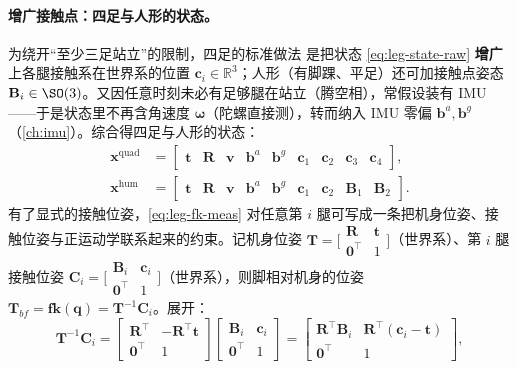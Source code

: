 \paragraph{增广接触点：四足与人形的状态。}
为绕开“至少三足站立”的限制，四足的标准做法\cite{bloesch2013state} 是把状态 \cref{eq:leg-state-raw} \textbf{增广}上各腿接触系在世界系的位置 $\mathbf{c}_i\in\mathbb{R}^3$；人形（有脚踝、平足）还可加接触点姿态 $\mathbf{B}_i\in\SO(3)$。又因任意时刻未必有足够腿在站立（腾空相），常假设装有 IMU——于是状态里不再含角速度 $\boldsymbol{\omega}$（陀螺直接测），转而纳入 IMU 零偏 $\mathbf{b}^a,\mathbf{b}^g$（\cref{ch:imu}）。综合得四足与人形的状态：
\begin{align}
  \mathbf{x}^{\text{quad}}&=\begin{bmatrix}\mathbf{t} & \mathbf{R} & \mathbf{v} & \mathbf{b}^a & \mathbf{b}^g & \mathbf{c}_1 & \mathbf{c}_2 & \mathbf{c}_3 & \mathbf{c}_4\end{bmatrix},\label{eq:leg-state-quad}\\
  \mathbf{x}^{\text{hum}}&=\begin{bmatrix}\mathbf{t} & \mathbf{R} & \mathbf{v} & \mathbf{b}^a & \mathbf{b}^g & \mathbf{c}_1 & \mathbf{c}_2 & \mathbf{B}_1 & \mathbf{B}_2\end{bmatrix}.\label{eq:leg-state-hum}
\end{align}
有了显式的接触位姿，\cref{eq:leg-fk-meas} 对任意第 $i$ 腿可写成一条把机身位姿、接触位姿与正运动学联系起来的约束。记机身位姿 $\mathbf{T}=\big[\begin{smallmatrix}\mathbf{R}&\mathbf{t}\\\mathbf{0}^\top&1\end{smallmatrix}\big]$（世界系）、第 $i$ 腿接触位姿 $\mathbf{C}_i=\big[\begin{smallmatrix}\mathbf{B}_i&\mathbf{c}_i\\\mathbf{0}^\top&1\end{smallmatrix}\big]$（世界系），则脚相对机身的位姿 $\mathbf{T}_{bf}=\mathbf{fk}(\mathbf{q})=\mathbf{T}^{-1}\mathbf{C}_i$。展开：
\begin{equation}
  \mathbf{T}^{-1}\mathbf{C}_i=\begin{bmatrix}\mathbf{R}^\top & -\mathbf{R}^\top\mathbf{t}\\\mathbf{0}^\top & 1\end{bmatrix}\begin{bmatrix}\mathbf{B}_i & \mathbf{c}_i\\\mathbf{0}^\top & 1\end{bmatrix}=\begin{bmatrix}\mathbf{R}^\top\mathbf{B}_i & \mathbf{R}^\top(\mathbf{c}_i-\mathbf{t})\\\mathbf{0}^\top & 1\end{bmatrix},
  \label{eq:leg-Tc-expand}
\end{equation}
